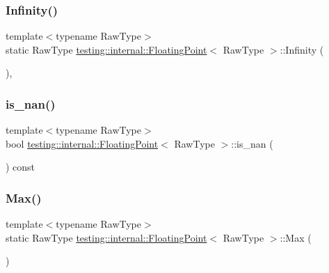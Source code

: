 \subsubsection{\texorpdfstring{Infinity()}{Infinity()}}
{\footnotesize\ttfamily template$<$typename Raw\+Type$>$ \\
static Raw\+Type \hyperlink{classtesting_1_1internal_1_1FloatingPoint}{testing\+::internal\+::\+Floating\+Point}$<$ Raw\+Type $>$\+::Infinity (\begin{DoxyParamCaption}{ }\end{DoxyParamCaption})\hspace{0.3cm}{\ttfamily [inline]}, {\ttfamily [static]}}

\mbox{\label{classtesting_1_1internal_1_1FloatingPoint_a1fc654fd206efa98e480aa1e034f30d5}} 
\subsubsection{\texorpdfstring{is\+\_\+nan()}{is\_nan()}}
{\footnotesize\ttfamily template$<$typename Raw\+Type$>$ \\
bool \hyperlink{classtesting_1_1internal_1_1FloatingPoint}{testing\+::internal\+::\+Floating\+Point}$<$ Raw\+Type $>$\+::is\+\_\+nan (\begin{DoxyParamCaption}{ }\end{DoxyParamCaption}) const\hspace{0.3cm}{\ttfamily [inline]}}

\mbox{\label{classtesting_1_1internal_1_1FloatingPoint_aae5954d8a57d3ff0987c6930cb68e114}} 
\subsubsection{\texorpdfstring{Max()}{Max()}\hspace{0.1cm}{\footnotesize\ttfamily [1/3]}}
{\footnotesize\ttfamily template$<$typename Raw\+Type$>$ \\
static Raw\+Type \hyperlink{classtesting_1_1internal_1_1FloatingPoint}{testing\+::internal\+::\+Floating\+Point}$<$ Raw\+Type $>$\+::Max (\begin{DoxyParamCaption}{ }\end{DoxyParamCaption})\hspace{0.3cm}{\ttfamily [static]}}


